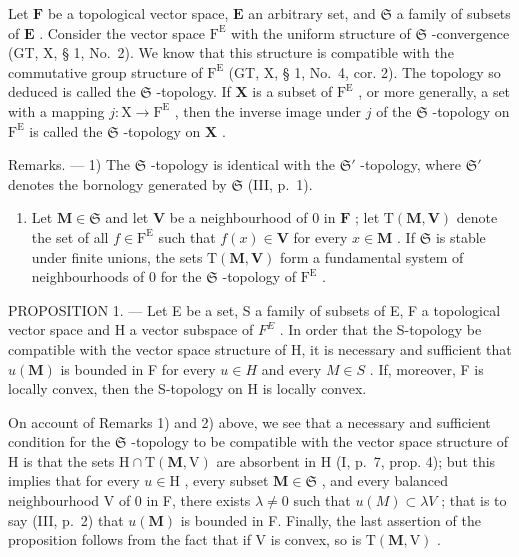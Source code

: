 Let \(\mathbf{F}\) be a topological vector space, \(\mathbf{E}\) an arbitrary set, and \(\mathfrak{S}\) a family of subsets of \(\mathbf{E}\) . Consider the vector space \(\mathrm{F}^{\mathrm{E}}\) with the uniform structure of \(\mathfrak{S}\) -convergence (GT, X, § 1, No.~2). We know that this structure is compatible with the commutative group structure of \(\mathrm{F}^{\mathrm{E}}\) (GT, X, § 1, No.~4, cor. 2). The topology so deduced is called the \(\mathfrak{S}\) -topology. If \(\mathbf{X}\) is a subset of \(\mathrm{F}^{\mathrm{E}}\) , or more generally, a set with a mapping \(j: \mathrm{X} \to \mathrm{F}^{\mathrm{E}}\) , then the inverse image under \(j\) of the \(\mathfrak{S}\) -topology on \(\mathrm{F}^{\mathrm{E}}\) is called the \(\mathfrak{S}\) -topology on \(\mathbf{X}\) .

Remarks. --- 1) The \(\mathfrak{S}\) -topology is identical with the \(\mathfrak{S}'\) -topology, where \(\mathfrak{S}'\) denotes the bornology generated by \(\mathfrak{S}\) (III, p.~1).

\begin{enumerate}
\def\labelenumi{\arabic{enumi})}
\setcounter{enumi}{1}
\tightlist
\item
  Let \(\mathbf{M} \in \mathfrak{S}\) and let \(\mathbf{V}\) be a neighbourhood of 0 in \(\mathbf{F}\) ; let \(\mathrm{T}(\mathbf{M}, \mathbf{V})\) denote the set of all \(f \in \mathrm{F}^{\mathrm{E}}\) such that \(f(x) \in \mathbf{V}\) for every \(x \in \mathbf{M}\) . If \(\mathfrak{S}\) is stable under finite unions, the sets \(\mathrm{T}(\mathbf{M}, \mathbf{V})\) form a fundamental system of neighbourhoods of 0 for the \(\mathfrak{S}\) -topology of \(\mathrm{F}^{\mathrm{E}}\) .
\end{enumerate}

PROPOSITION 1. --- Let E be a set, S a family of subsets of E, F a topological vector space and H a vector subspace of \(F^{E}\) . In order that the S-topology be compatible with the vector space structure of H, it is necessary and sufficient that \(u(\mathbf{M})\) is bounded in F for every \(u \in H\) and every \(M \in S\) . If, moreover, F is locally convex, then the S-topology on H is locally convex.

On account of Remarks 1) and 2) above, we see that a necessary and sufficient condition for the \(\mathfrak{S}\) -topology to be compatible with the vector space structure of H is that the sets \(\mathrm{H} \cap \mathrm{T}(\mathbf{M}, \mathrm{V})\) are absorbent in H (I, p.~7, prop. 4); but this implies that for every \(u \in \mathrm{H}\) , every subset \(\mathbf{M} \in \mathfrak{S}\) , and every balanced neighbourhood V of 0 in F, there exists \(\lambda \neq 0\) such that \(u(M) \subset \lambda V\) ; that is to say (III, p.~2) that \(u(\mathbf{M})\) is bounded in F. Finally, the last assertion of the proposition follows from the fact that if V is convex, so is \(\mathrm{T}(\mathbf{M}, \mathrm{V})\) .

